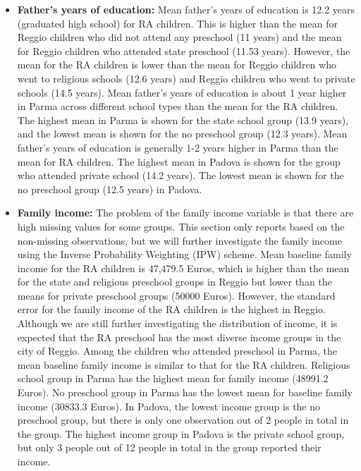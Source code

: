 \documentclass[12pt]{article}
\begin{document}
\begin{itemize}
\item \textbf{Father's years of education:} Mean father's years of education is 12.2 years (graduated high school) for RA children. This is higher than the mean for Reggio children who did not attend any preschool (11 years) and the mean for Reggio children who attended state preschool (11.53 years). However, the mean for the RA children is lower than the mean for Reggio children who went to religious schools (12.6 years) and Reggio children who went to private schools (14.5 years). Mean father's years of education is about 1 year higher in Parma across different school types than the mean for the RA children. The highest mean in Parma is shown for the state school group (13.9 years), and the lowest mean is shown for the no preschool group (12.3 years). Mean father's years of education is generally 1-2 years higher in Parma than the mean for RA children. The highest mean in Padova is shown for the group who attended private school (14.2 years). The lowest mean is shown for the no preschool group (12.5 years) in Padova.

\item \textbf{Family income:} The problem of the family income variable is that there are high missing values for some groups. This section only reports based on the non-missing observations, but we will further investigate the family income using the Inverse Probability Weighting (IPW) scheme. Mean baseline family income for the RA children is 47,479.5 Euros, which is higher than the mean for the state and religious preschool groups in Reggio but lower than the means for private preschool groups (50000 Euros). However, the standard error for the family income of the RA children is the highest in Reggio. Although we are still further investigating the distribution of income, it is expected that the RA preschool has the most diverse income groups in the city of Reggio. Among the children who attended preschool in Parma, the mean baseline family income is similar to that for the RA children. Religious school group in Parma has the highest mean for family income (48991.2 Euros). No preschool group in Parma has the lowest mean for baseline family income (30833.3 Euros). In Padova, the lowest income group is the no preschool group, but there is only one observation out of 2 people in total in the group. The highest income group in Padova is the private school group, but only 3 people out of 12 people in total in the group reported their income. 


\end{itemize}
\end{document}
